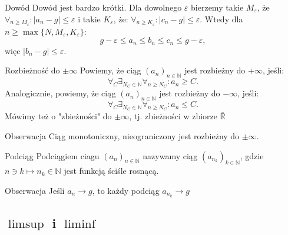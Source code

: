 \documentclass{article}
\newcommand{\R}{\mathbb{R}}
\newcommand{\N}{\mathbb{N}}
\newcommand{\oo}{\infty}
\newcommand{\eps}{\varepsilon}
\newcommand{\ciag}[1]{(#1_{n})_{n \in \N}}
\begin{document}
    \begin{dow}{Dowód}
        Dowód jest bardzo krótki. Dla dowolnego $\eps$ bierzemy takie $M_{\eps}$, że $\forall_{n \geqslant M_{\eps}}: |a_n - g| \leqslant \eps $ i takie $K_{\eps}$, że: $\forall_{n \geqslant K_{\eps}}: |c_n - g| \leqslant \eps $. Wtedy dla $n \geqslant \max\{N, M_\eps, K_\eps \}$: \begin{equation}
            g - \eps \leqslant a_n \leqslant b_n \leqslant c_n \leqslant g - \eps,
        \end{equation}
        więc $|b_n - g| \leqslant \eps$.
    \end{dow}



    \begin{defr}{Rozbieżność do $\pm \oo$}
        Powiemy, że ciąg $\ciag{a}$ jest rozbieżny do $+\oo$, jeśli: \begin{equation}
            \forall_C \exists_{N_C \in \N} \forall_{n \geqslant N_C}: a_n \geqslant C.
        \end{equation} 
        Analogicznie, powiemy, że ciąg $\ciag{a}$ jest rozbieżny do $-\oo$, jeśli: \begin{equation}
            \forall_C \exists_{N_C \in \N} \forall_{n \geqslant N_C}: a_n \leqslant C.
        \end{equation}
        Mówimy też o "zbieżności" do $\pm \oo$, tj. zbieżności w zbiorze $\overline{\R}$
    \end{defr}

    \begin{obs}{Obserwacja}
        Ciąg monotoniczny, nieograniczony jest rozbieżny do $\pm \oo$.
    \end{obs}

    \begin{defr}{Podciąg}
        Podciągiem ciagu $\ciag{a}$ nazywamy ciąg $(a_{n_k})_{k \in \N}$, gdzie $n \ni k \mapsto n_k \in \N$ jest funkcją ściśle rosnącą.
    \end{defr}


    \begin{obs}{Obserwacja}
        Jeśli $a_n \to g$, to każdy podciąg $a_{n_k} \to g$
    \end{obs}





    \subsection{$\limsup$ i $\liminf$}
\end{document}
